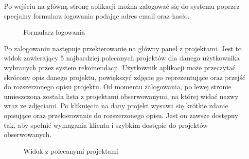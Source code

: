 Po wejściu na główną stronę aplikacji można zalogować się do systemu poprzez specjalny formularz logowania podając adres email oraz hasło. 



\begin{figure}[h!]
	\caption{Formularz logowania}
	\centering
\end{figure}


Po zalogowaniu następuje przekierowanie na główny panel z projektami. Jest to widok zawierający 5 najbardziej polecanych projektów dla danego użytkownika wybranych przez system rekomendacji. Użytkownik aplikacji może przeczytać skrócony opis danego projektu, powiększyć zdjęcie go reprezentujące oraz przejść do rozszerzonego opisu projektu. Od momentu zalogowania, po lewej stronie umieszczona została lista z projektami obserwowanymi, na której widać nazwy wraz ze zdjęciami. Po kliknięciu na dany projekt wysuwa się krótkie zdanie opisujące oraz przekierowanie do rozszerzonego opisu. Jest on zawsze dostępny tak, aby spełnić wymagania klienta i szybkim dostępie do projektów obserwowanych.

\begin{figure}[h!]
	\caption{Widok z polecanymi projektami}
	\centering
\end{figure}

